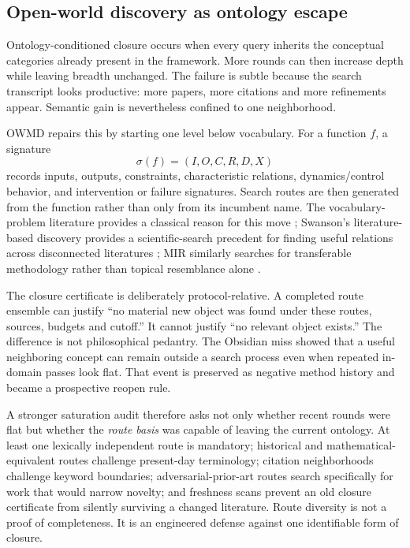 \subsection{Open-world discovery as ontology escape}

Ontology-conditioned closure occurs when every query inherits the conceptual categories already present in the framework. More rounds can then increase depth while leaving breadth unchanged. The failure is subtle because the search transcript looks productive: more papers, more citations and more refinements appear. Semantic gain is nevertheless confined to one neighborhood.

OWMD repairs this by starting one level below vocabulary. For a function \(f\), a signature
\[
\sigma(f)=(I,O,C,R,D,X)
\]
records inputs, outputs, constraints, characteristic relations, dynamics/control behavior, and intervention or failure signatures. Search routes are then generated from the function rather than only from its incumbent name. The vocabulary-problem literature provides a classical reason for this move \cite{furnas1987}; Swanson's literature-based discovery provides a scientific-search precedent for finding useful relations across disconnected literatures \cite{swanson1986}; MIR similarly searches for transferable methodology rather than topical resemblance alone \cite{garikaparthi2025}.

The closure certificate is deliberately protocol-relative. A completed route ensemble can justify ``no material new object was found under these routes, sources, budgets and cutoff.'' It cannot justify ``no relevant object exists.'' The difference is not philosophical pedantry. The Obsidian miss showed that a useful neighboring concept can remain outside a search process even when repeated in-domain passes look flat. That event is preserved as negative method history and became a prospective reopen rule.

A stronger saturation audit therefore asks not only whether recent rounds were flat but whether the \emph{route basis} was capable of leaving the current ontology. At least one lexically independent route is mandatory; historical and mathematical-equivalent routes challenge present-day terminology; citation neighborhoods challenge keyword boundaries; adversarial-prior-art routes search specifically for work that would narrow novelty; and freshness scans prevent an old closure certificate from silently surviving a changed literature. Route diversity is not a proof of completeness. It is an engineered defense against one identifiable form of closure.


